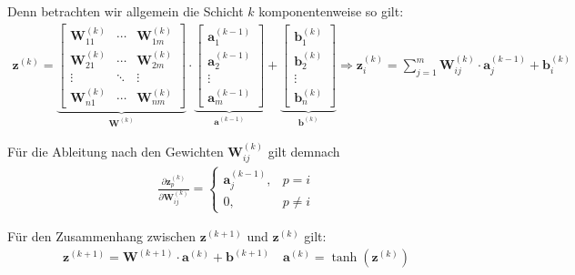 \documentclass[a4paper, 12pt]{scrartcl}
\begin{document}
\begin{beweis}
    Denn betrachten wir allgemein die Schicht $k$ komponentenweise so gilt:
    \begin{align*}
        \bm{z}^{(k)} 
        =
        \underbrace{
            \begin{bmatrix}
                \bm{W}_{11}^{(k)} & \cdots   & \bm{W}_{1 m}^{(k)} \\
                \bm{W}_{21}^{(k)} & \cdots   & \bm{W}_{2 m}^{(k)}  \\
                \vdots & \ddots &  \vdots\\
                \bm{W}_{n 1}^{(k)} & \cdots  & \bm{W}_{n m}^{(k)}
            \end{bmatrix}
        }_{\bm{W}^{(k)}}
        \cdot
        \underbrace{
            \begin{bmatrix}
                \bm{a}_1^{(k-1)} \\
                \bm{a}_2^{(k-1)} \\
                \vdots \\
                \bm{a}_{m}^{(k-1)}
            \end{bmatrix}
        }_{\bm{a}^{(k-1)}}
        +
        \underbrace{
            \begin{bmatrix}
                \bm{b}_1^{(k)} \\
                \bm{b}_2^{(k)} \\
                \vdots \\
                \bm{b}_{n}^{(k)}
            \end{bmatrix}
        }_{\bm{b}^{(k)}}
        \Rightarrow
        \bm{z}_i^{(k)}
        =
        \sum_{j=1}^{m} \bm{W}_{i j}^{(k)} \cdot \bm{a}_{j}^{(k-1)} + \bm{b}_{i}^{(k)}
    \end{align*}

    Für die Ableitung nach den Gewichten $\bm{W}_{ij}^{(k)}$ gilt demnach
    \begin{align*}
        \frac{\partial \bm{z}_p^{(k)}}{\partial \bm{W}_{ij}^{(k)}} 
        = 
        \begin{cases}
            \bm{a}_j^{(k-1)} , & p=i \\
            0 , & p \neq i
        \end{cases}
    \end{align*}

    Für den Zusammenhang zwischen $\bm{z}^{(k+1)}$ und $\bm{z}^{(k)}$ gilt: 
    \begin{align*}
        \bm{z}^{(k+1)} = \bm{W}^{(k+1)} \cdot \bm{a}^{(k)} + \bm{b}^{(k+1)} \quad \bm{a}^{(k)} = \tanh(\bm{z}^{(k)})
    \end{align*}


\end{beweis}
\end{document}
